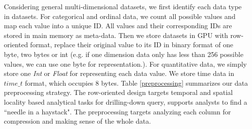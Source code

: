 \documentclass[journal]{vgtc}                %
\begin{document}
{%

Considering general multi-dimensional datasets, we first identify each data type in datasets. For categorical and ordinal data, we count  all possible values and map each value into a unique ID. All values and their corresponding IDs are stored in main memory as meta-data. %
Then we store datasets in GPU with row-oriented format, replace their original value to its ID  in binary format of one byte, two bytes or int (e.g. if one dimension data only has less than 256 possible values, we can use one byte for representation.). For quantitative data, we simply store one \emph{Int} or \emph{Float} for representing each data value. We store  time data in \emph{$time\_t$} format, which occupies 8 bytes. Table \ref{preprocessing} summarizes our data preprocessing strategy. The row-oriented design targets temporal and spatial locality based analytical tasks for drilling-down query, supports analysts to find  a ``needle in a haystack".  The preprocessing targets analyzing each column for compression and making sense of the whole data.

}
\end{document}
